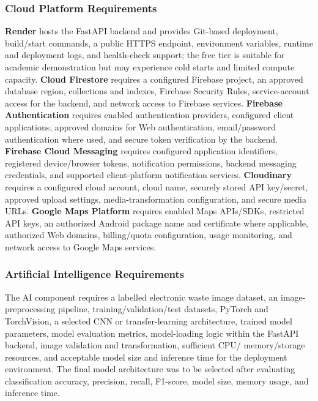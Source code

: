 \subsubsection{Cloud Platform Requirements}
\textbf{Render} hosts the FastAPI backend and provides Git-based
deployment, build/start commands, a public HTTPS endpoint, environment
variables, runtime and deployment logs, and health-check support; the free
tier is suitable for academic demonstration but may experience cold starts and
limited compute capacity. \textbf{Cloud Firestore} requires a configured
Firebase project, an approved database region, collections and indexes,
Firebase Security Rules, service-account access for the backend, and network
access to Firebase services. \textbf{Firebase Authentication} requires enabled
authentication providers, configured client applications, approved domains
for Web authentication, email/password authentication where used, and
secure token verification by the backend. \textbf{Firebase Cloud Messaging}
requires configured application identifiers, registered device/browser tokens,
notification permissions, backend messaging credentials, and supported
client-platform notification services. \textbf{Cloudinary} requires a configured
cloud account, cloud name, securely stored API key/secret, approved upload
settings, media-transformation configuration, and secure media URLs.
\textbf{Google Maps Platform} requires enabled Maps APIs/SDKs, restricted
API keys, an authorized Android package name and certificate where
applicable, authorized Web domains, billing/quota configuration, usage
monitoring, and network access to Google Maps services.

\subsubsection{Artificial Intelligence Requirements}
The AI component requires a labelled electronic waste image dataset, an
image-preprocessing pipeline, training/validation/test datasets, PyTorch and
TorchVision, a selected CNN or transfer-learning architecture, trained model
parameters, model evaluation metrics, model-loading logic within the
FastAPI backend, image validation and transformation, sufficient CPU/
memory/storage resources, and acceptable model size and inference time for
the deployment environment. The final model architecture was to be selected
after evaluating classification accuracy, precision, recall, F1-score, model
size, memory usage, and inference time.

